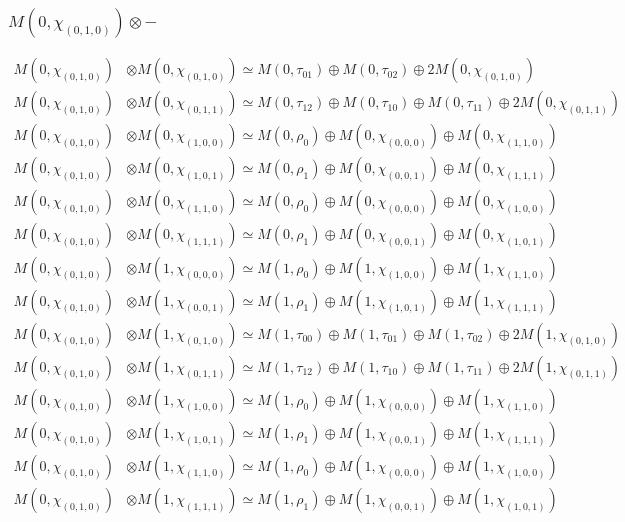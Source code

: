 \subsubsection{$ M(0,\chi_{(0,1,0)})\otimes -$}
\begin{align*}
M(0,\chi_{(0,1,0)}) &\otimes M(0,\chi_{(0,1,0)}) \simeq M(0,\tau_{01}) \oplus M(0,\tau_{02}) \oplus 2 M(0,\chi_{(0,1,0)}) \\
M(0,\chi_{(0,1,0)}) &\otimes M(0,\chi_{(0,1,1)}) \simeq M(0,\tau_{12}) \oplus M(0,\tau_{10}) \oplus M(0,\tau_{11}) \oplus 2 M(0,\chi_{(0,1,1)}) \\
M(0,\chi_{(0,1,0)}) &\otimes M(0,\chi_{(1,0,0)}) \simeq M(0,\rho_{0}) \oplus M(0,\chi_{(0,0,0)}) \oplus M(0,\chi_{(1,1,0)}) \\
M(0,\chi_{(0,1,0)}) &\otimes M(0,\chi_{(1,0,1)}) \simeq M(0,\rho_{1}) \oplus M(0,\chi_{(0,0,1)}) \oplus M(0,\chi_{(1,1,1)}) \\
M(0,\chi_{(0,1,0)}) &\otimes M(0,\chi_{(1,1,0)}) \simeq M(0,\rho_{0}) \oplus M(0,\chi_{(0,0,0)}) \oplus M(0,\chi_{(1,0,0)}) \\
M(0,\chi_{(0,1,0)}) &\otimes M(0,\chi_{(1,1,1)}) \simeq M(0,\rho_{1}) \oplus M(0,\chi_{(0,0,1)}) \oplus M(0,\chi_{(1,0,1)}) \\
M(0,\chi_{(0,1,0)}) &\otimes M(1,\chi_{(0,0,0)}) \simeq M(1,\rho_{0}) \oplus M(1,\chi_{(1,0,0)}) \oplus M(1,\chi_{(1,1,0)}) \\
M(0,\chi_{(0,1,0)}) &\otimes M(1,\chi_{(0,0,1)}) \simeq M(1,\rho_{1}) \oplus M(1,\chi_{(1,0,1)}) \oplus M(1,\chi_{(1,1,1)}) \\
M(0,\chi_{(0,1,0)}) &\otimes M(1,\chi_{(0,1,0)}) \simeq M(1,\tau_{00}) \oplus M(1,\tau_{01}) \oplus M(1,\tau_{02}) \oplus 2 M(1,\chi_{(0,1,0)}) \\
M(0,\chi_{(0,1,0)}) &\otimes M(1,\chi_{(0,1,1)}) \simeq M(1,\tau_{12}) \oplus M(1,\tau_{10}) \oplus M(1,\tau_{11}) \oplus 2 M(1,\chi_{(0,1,1)}) \\
M(0,\chi_{(0,1,0)}) &\otimes M(1,\chi_{(1,0,0)}) \simeq M(1,\rho_{0}) \oplus M(1,\chi_{(0,0,0)}) \oplus M(1,\chi_{(1,1,0)}) \\
M(0,\chi_{(0,1,0)}) &\otimes M(1,\chi_{(1,0,1)}) \simeq M(1,\rho_{1}) \oplus M(1,\chi_{(0,0,1)}) \oplus M(1,\chi_{(1,1,1)}) \\
M(0,\chi_{(0,1,0)}) &\otimes M(1,\chi_{(1,1,0)}) \simeq M(1,\rho_{0}) \oplus M(1,\chi_{(0,0,0)}) \oplus M(1,\chi_{(1,0,0)}) \\
M(0,\chi_{(0,1,0)}) &\otimes M(1,\chi_{(1,1,1)}) \simeq M(1,\rho_{1}) \oplus M(1,\chi_{(0,0,1)}) \oplus M(1,\chi_{(1,0,1)}) \\

\end{align*}
